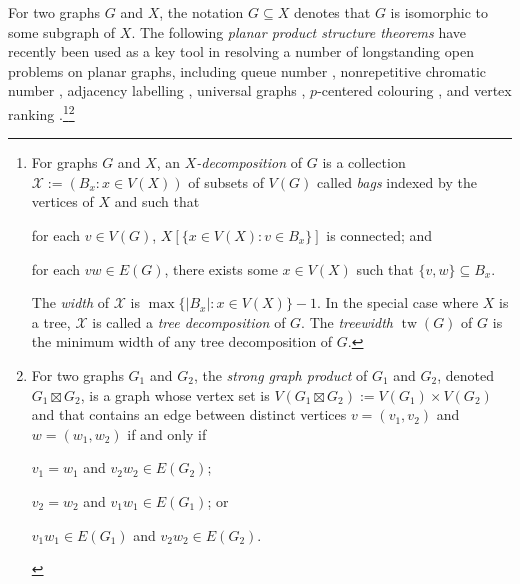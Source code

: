 \documentclass{patmorin}
\DeclareMathOperator{\tw}{tw}
\begin{document}
For two graphs $G$ and $X$, the notation $G\subseteq X$ denotes that $G$ is isomorphic to some subgraph of $X$. 
The following \emph{planar product structure theorems} have recently been used as a key tool in resolving a number of longstanding open problems on planar graphs, including queue number \cite{dujmovic.joret.ea:planar}, nonrepetitive chromatic number \cite{dujmovic.esperet.ea:planar}, adjacency labelling \cite{dujmovic.esperet.ea:adjacency}, universal graphs \cite{esperet.joret.ea:sparse}, $p$-centered colouring \cite{debski.felsner.ea:improved}, and vertex ranking \cite{bose.dujmovic.ea:asymptotically}.\footnote{For graphs $G$ and $X$, an \emph{$X$-decomposition} of $G$ is a collection $\mathcal{X}:=(B_x:x\in V(X))$ of subsets of $V(G)$ called \emph{bags} indexed by the vertices of $X$ and such that
 \begin{inparaenum}[(i)]
     \item for each $v\in V(G)$, $X[\{x\in V(X):v\in B_x\}]$ is connected; and
     \item for each $vw\in E(G)$, there exists some $x\in V(X)$ such that $\{v,w\}\subseteq B_x$.
\end{inparaenum}
The \emph{width} of $\mathcal{X}$ is $\max\{|B_x|:x\in V(X)\}-1$. In the special case where $X$ is a tree, $\mathcal{X}$ is called a \emph{tree decomposition} of $G$. The \emph{treewidth} $\tw(G)$ of $G$ is the minimum width of any tree decomposition of $G$.}\footnote{
For two graphs $G_1$ and $G_2$, the \emph{strong graph product} of $G_1$ and $G_2$, denoted $G_1\boxtimes G_2$, is a graph whose vertex set is $V(G_1\boxtimes G_2):= V(G_1)\times V(G_2)$ and that contains an edge between distinct vertices $v=(v_1,v_2)$ and $w=(w_1,w_2)$ if and only if
\begin{inparaenum}[(i)]
    \item $v_1=w_1$ and $v_2w_2\in E(G_2)$;
    \item $v_2=w_2$ and $v_1w_1\in E(G_1)$; or
    \item $v_1w_1\in E(G_1)$ and $v_2w_2\in E(G_2)$.
\end{inparaenum}
}



\end{document}
